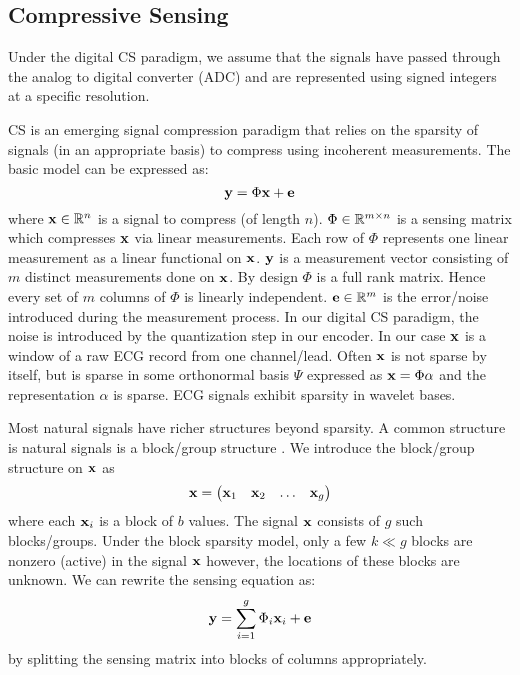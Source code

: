 \subsection{Compressive Sensing}
\label{appsec:cs}
Under the digital CS paradigm, we assume that the
signals have passed through the analog to digital
converter (ADC) and are represented using signed integers
at a specific resolution.

CS is an emerging signal compression paradigm that relies
on the sparsity of signals (in an appropriate basis)
to compress using incoherent measurements.
The basic model can be expressed as:
\begin{equation}
\mathbf{y} = \Phi \mathbf{x} + \mathbf{e}
\end{equation}
where $\mathbf{x} \in \mathbb{R}^n$ is a signal to compress
(of length $n$). $\Phi \in \mathbb{R}^{m \times n}$
is a sensing matrix which compresses $\mathbf{x}$
via linear measurements. Each row of $\Phi$
represents one linear measurement as a linear
functional on $\mathbf{x}$. $\mathbf{y}$ is a measurement
vector consisting of $m$ distinct measurements
done on $\mathbf{x}$. By design $\Phi$ is a full
rank matrix. Hence every set of $m$ columns of $\Phi$
is linearly independent. $\mathbf{e} \in \mathbb{R}^m$ is the
error/noise introduced during the measurement process.
In our digital CS paradigm, the noise is introduced
by the quantization step in our encoder.
In our case $\mathbf{x}$ is a window of a raw ECG record
from one channel/lead. 
Often $\mathbf{x}$ is not sparse by itself, but is sparse
in some orthonormal basis $\Psi$ expressed as
$\mathbf{x} = \Phi \alpha$ and the representation $\alpha$
is sparse. ECG signals exhibit sparsity in wavelet
bases.

Most natural signals have richer structures beyond
sparsity. A common structure is natural signals
is a block/group structure \cite{eldar2010block}. 
We introduce the block/group structure on $\mathbf{x}$ as
\begin{equation}
\mathbf{x} = \begin{pmatrix}
\mathbf{x}_1 & \mathbf{x}_2 & \dots & \mathbf{x}_g
\end{pmatrix}
\end{equation}
where each $\mathbf{x}_i$ is a block of $b$ values.
The signal $\mathbf{x}$ consists of $g$ such blocks/groups.
Under the block sparsity model, only a few $k \ll g$
blocks are nonzero (active) in the signal $\mathbf{x}$
however, the locations of these blocks are unknown.
We can rewrite the sensing equation as:
\begin{equation}
\mathbf{y} = \sum_{i=1}^g \Phi_i \mathbf{x}_i + \mathbf{e}
\end{equation}
by splitting the sensing matrix into blocks of columns appropriately.

